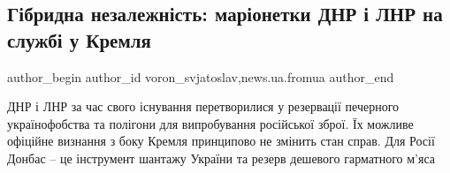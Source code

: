  
 
 
 
 
\subsection{Гібридна незалежність: маріонетки ДНР і ЛНР на службі у Кремля}
\label{sec:21_01_2022.stz.news.ua.fromua.1.lnr_dnr_marionetki}
 
\ifcmt
 author_begin
   author_id voron_svjatoslav,news.ua.fromua
 author_end
\fi

\begin{zznagolos}
ДНР і ЛНР за час свого існування перетворилися у резервації печерного
українофобства та полігони для випробування російської зброї. Їх можливе
офіційне визнання з боку Кремля принципово не змінить стан справ. Для Росії
Донбас – це інструмент шантажу України та резерв дешевого гарматного м’яса
\end{zznagolos}



